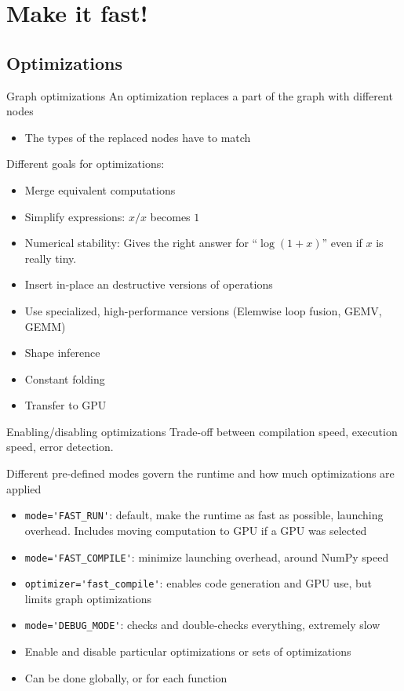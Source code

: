 \documentclass[a4paper,9pt]{beamer}
\begin{document}
\section{Make it fast!}
\begin{frame}
  \tableofcontents[currentsection]
\end{frame}
\subsection{Optimizations}
\begin{frame}{Graph optimizations}
  An optimization replaces a part of the graph with different nodes
  \begin{itemize}
    \item The types of the replaced nodes have to match
  \end{itemize}
  Different goals for optimizations:
  \begin{itemize}
    \item Merge equivalent computations
    \item Simplify expressions: $x / x$ becomes $1$
    \item Numerical stability: Gives the right answer for ``$\log (1 + x)$'' even if $x$ is really tiny.
    \item Insert in-place an destructive versions of operations
    \item Use specialized, high-performance versions (Elemwise loop fusion, GEMV, GEMM)
    \item Shape inference
    \item Constant folding
    \item Transfer to GPU
  \end{itemize}
\end{frame}

\begin{frame}[fragile]{Enabling/disabling optimizations}
  Trade-off between compilation speed, execution speed, error detection.

  Different pre-defined modes govern the runtime and how much optimizations are applied
  \begin{itemize}
    \item \verb|mode='FAST_RUN'|: default, make the runtime as fast as possible, launching overhead.
      Includes moving computation to GPU if a GPU was selected
    \item \verb|mode='FAST_COMPILE'|: minimize launching overhead, around NumPy speed
    \item \verb|optimizer='fast_compile'|: enables code generation and GPU use, but limits graph optimizations
    \item \verb|mode='DEBUG_MODE'|: checks and double-checks everything, extremely slow
    \item Enable and disable particular optimizations or sets of optimizations
    \item Can be done globally, or for each function
  \end{itemize}

\end{frame}
\end{document}
